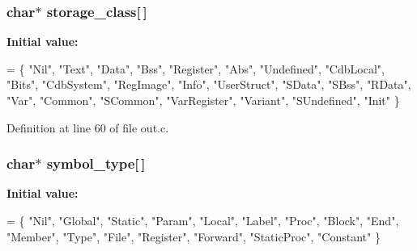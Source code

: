\subsubsection[{storage\+\_\+class}]{\setlength{\rightskip}{0pt plus 5cm}char$\ast$ storage\+\_\+class[$\,$]}\label{out_8c_a97b4f36407c7aeeee031bd65ef0d990d}
{\bfseries Initial value\+:}
\begin{DoxyCode}
= \{
  \textcolor{stringliteral}{"Nil"}, \textcolor{stringliteral}{"Text"}, \textcolor{stringliteral}{"Data"}, \textcolor{stringliteral}{"Bss"}, \textcolor{stringliteral}{"Register"}, \textcolor{stringliteral}{"Abs"}, \textcolor{stringliteral}{"Undefined"}, \textcolor{stringliteral}{"CdbLocal"},
  \textcolor{stringliteral}{"Bits"}, \textcolor{stringliteral}{"CdbSystem"}, \textcolor{stringliteral}{"RegImage"}, \textcolor{stringliteral}{"Info"}, \textcolor{stringliteral}{"UserStruct"}, \textcolor{stringliteral}{"SData"}, \textcolor{stringliteral}{"SBss"},
  \textcolor{stringliteral}{"RData"}, \textcolor{stringliteral}{"Var"}, \textcolor{stringliteral}{"Common"}, \textcolor{stringliteral}{"SCommon"}, \textcolor{stringliteral}{"VarRegister"}, \textcolor{stringliteral}{"Variant"}, \textcolor{stringliteral}{"SUndefined"},
  \textcolor{stringliteral}{"Init"} \}
\end{DoxyCode}


Definition at line 60 of file out.\+c.

\subsubsection[{symbol\+\_\+type}]{\setlength{\rightskip}{0pt plus 5cm}char$\ast$ symbol\+\_\+type[$\,$]}\label{out_8c_a5c3abc4fe141ab1bc5522d724df03c81}
{\bfseries Initial value\+:}
\begin{DoxyCode}
= \{
  \textcolor{stringliteral}{"Nil"}, \textcolor{stringliteral}{"Global"}, \textcolor{stringliteral}{"Static"}, \textcolor{stringliteral}{"Param"}, \textcolor{stringliteral}{"Local"}, \textcolor{stringliteral}{"Label"}, \textcolor{stringliteral}{"Proc"}, \textcolor{stringliteral}{"Block"},
  \textcolor{stringliteral}{"End"}, \textcolor{stringliteral}{"Member"}, \textcolor{stringliteral}{"Type"}, \textcolor{stringliteral}{"File"}, \textcolor{stringliteral}{"Register"}, \textcolor{stringliteral}{"Forward"}, \textcolor{stringliteral}{"StaticProc"},
  \textcolor{stringliteral}{"Constant"} \}
\end{DoxyCode}


